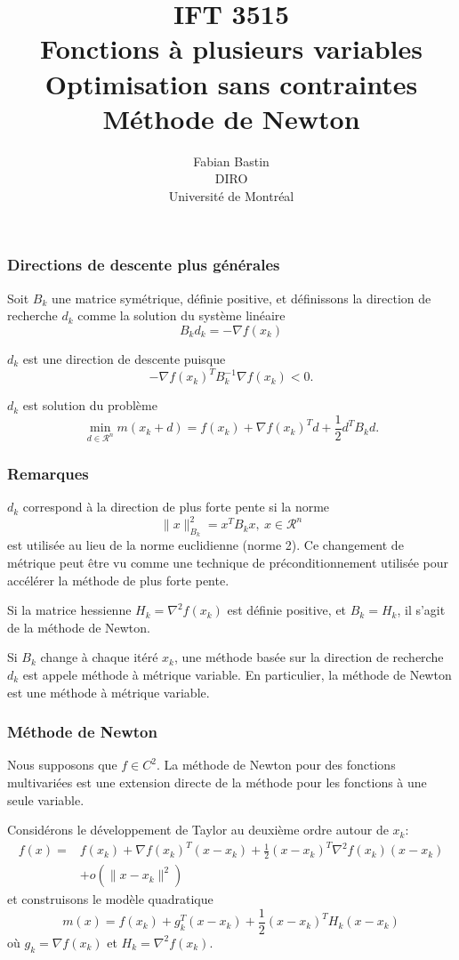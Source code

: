 \documentclass[usepdftitle=false]{beamer}
\title[IFT3515]{IFT 3515\\Fonctions à plusieurs variables\\Optimisation sans contraintes\\Méthode de Newton}
\author[Fabian Bastin]{Fabian Bastin\\DIRO\\Université de Montréal}
\date{}
\def\blue{\color{blue}}
\def\cR{\mathcal{R}}
\begin{document}
\frame{\titlepage}


\begin{frame}
\frametitle{Directions de descente plus générales}

Soit $B_k$ une matrice symétrique, définie positive, et définissons la direction de recherche $d_k$ comme la solution du système linéaire
$$
B_k d_k = - \nabla f(x_k)
$$

\mbox{}

$d_k$ est une direction de descente puisque
$$
- \nabla f(x_k)^T B_k^{-1} \nabla f(x_k) < 0.
$$

\mbox{}

$d_k$ est solution du problème
$$
\min_{d \in \cR^n} m(x_k + d) = f(x_k) + \nabla f(x_k)^T d + \frac{1}{2} d^T B_k d.
$$

\end{frame}

\begin{frame}
\frametitle{Remarques}

$d_k$ correspond à la direction de plus forte pente si la norme
$$
\| x \|^2_{B_k} = x^T B_k x,\ x \in \cR^n
$$
est utilisée au lieu de la norme euclidienne (norme 2).
Ce changement de métrique peut être vu comme une technique de préconditionnement utilisée pour accélérer la méthode de plus forte pente.

\mbox{}

Si la matrice hessienne $H_k = \nabla^2 f(x_k)$ est définie positive, et $B_k = H_k$, il s'agit de la méthode de Newton.

\mbox{}

Si $B_k$ change à chaque itéré $x_k$, une méthode basée sur la direction de recherche $d_k$ est appele {\blue méthode à métrique variable}.
En particulier, la méthode de Newton est une méthode à métrique variable.

\end{frame}

\begin{frame}
\frametitle{Méthode de Newton}

Nous supposons que $f \in C^2$.
La méthode de Newton pour des fonctions multivariées est une extension directe de la méthode pour les fonctions à une seule variable.

\mbox{}

Considérons le développement de Taylor au deuxième ordre autour de $x_k$:
\begin{align*}
f(x) = & f(x_k) + \nabla f(x_k)^T(x-x_k) + \frac{1}{2} (x-x_k)^T \nabla^2 f(x_k) (x-x_k) \\
& + o(\| x - x_k \|^2)
\end{align*}
et construisons le modèle quadratique
$$
m(x) = f(x_k) + g_k^T(x-x_k) + \frac{1}{2} (x-x_k)^T H_k (x-x_k)
$$
où $g_k = \nabla f(x_k)$ et $H_k = \nabla^2 f(x_k)$.

\end{frame}
\end{document}
